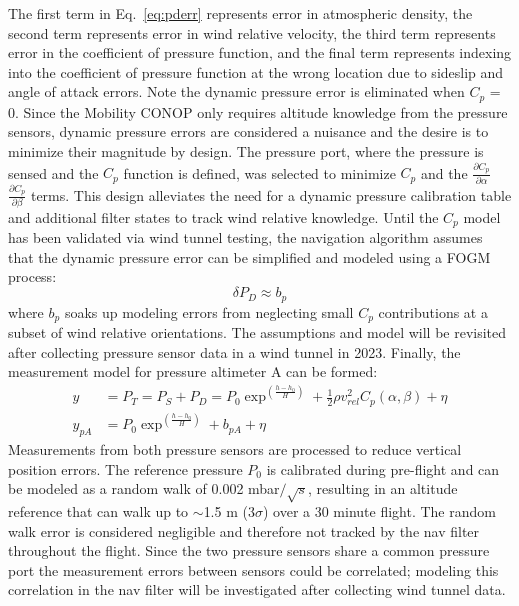 \noindent The first term in Eq.~\ref{eq:pderr} represents error in atmospheric density, the second term represents error in wind relative velocity, the third term represents error in the coefficient of pressure function, and the final term represents indexing into the coefficient of pressure function at the wrong location due to sideslip and angle of attack errors. Note the dynamic pressure error is eliminated when $C_{p}$ = 0. Since the Mobility CONOP only requires altitude knowledge from the pressure sensors, dynamic pressure errors are considered a nuisance and the desire is to minimize their magnitude by design. The pressure port, where the pressure is sensed and the $C_{p}$ function is defined, was selected to minimize $C_{p}$ and the $\frac{\partial C_{p}}{\partial \alpha}$ $\frac{\partial C_{p}}{\partial \beta}$ terms. This design alleviates the need for a dynamic pressure calibration table and additional filter states to track wind relative knowledge. Until the $C_{p}$ model has been validated via wind tunnel testing, the navigation algorithm assumes that the dynamic pressure error can be simplified and modeled using a FOGM process:
\begin{equation}
    \delta P_{D} \approx b_{p} 
\end{equation}
\noindent where $b_{p}$ soaks up modeling errors from neglecting small $C_{p}$ contributions at a subset of wind relative orientations. The assumptions and model will be revisited after collecting pressure sensor data in a wind tunnel in 2023. Finally, the measurement model for pressure altimeter A can be formed:
\begin{align}
    y       &= P_{T} = P_{S} + P_{D} = P_{0} \exp^{\left(\frac{h - h_{0}}{H}\right)} + \frac{1}{2}\rho v_{rel}^2 C_{p}\left(\alpha, \beta\right) + \eta \\
    y_{pA} &= P_{0} \exp^{\left(\frac{h - h_{0}}{H}\right)} + b_{pA} + \eta
\end{align}
\noindent Measurements from both pressure sensors are processed to reduce vertical position errors. The reference pressure $P_{0}$ is calibrated during pre-flight and can be modeled as a random walk of 0.002 mbar$/{\sqrt{s}}$, resulting in an altitude reference that can walk up to $\sim$1.5 m (3$\sigma$) over a 30 minute flight. The random walk error is considered negligible and therefore not tracked by the nav filter throughout the flight. Since the two pressure sensors share a common pressure port the measurement errors between sensors could be correlated;  modeling this correlation in the nav filter will be investigated after collecting wind tunnel data.  


